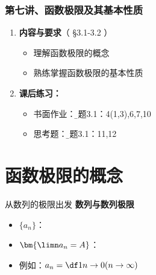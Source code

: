 \begin{frame}
	\frametitle{第七讲、函数极限及其基本性质}
	\linespread{1.5}
	\begin{enumerate}
	  \item {\bf 内容与要求}{\color{blue}（ \S3.1-3.2 ）}
	  \begin{itemize}
	    \item 理解函数极限的概念
	    \item 熟练掌握函数极限的基本性质
	  \vspace{1em}
	  \end{itemize}
	  \item {\bf 课后练习：}
	  \begin{itemize}
	    \item 书面作业：{\b 习题3.1：4(1,3),6,7,10}
	    \item 思考题：{\b 习题3.1：11,12}
	  \end{itemize}
	\end{enumerate}
\end{frame}

\section{函数极限的概念}

\begin{frame}{从数列的极限出发}
	\linespread{1.6}\pause
	{\bf 数列与数列极限}\pause
	\begin{itemize}
	  \item $\{a_n\}$：\pause
	  \item $\bm{\limn a_n=A}$：\pause
 	  \item 例如：$a_n=\df 1n\to 0(n\to\infty)$
	\end{itemize}
\end{frame}

